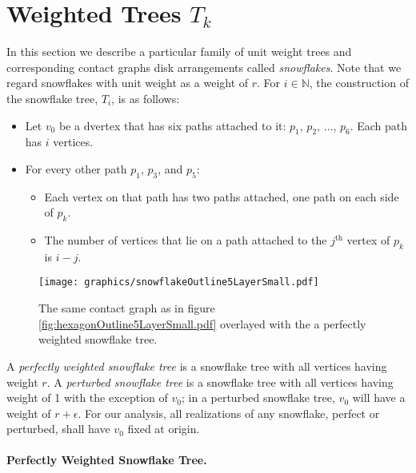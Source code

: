 \documentclass[10pt]{CSUNthesis}
\theoremstyle{plain}%
\theoremstyle{definition}
\theoremstyle{remark}
\newcommand{\bbN}{{\mathbb{N}}}
\begin{document}
\section{Weighted Trees $T_k$}
In this section we describe a particular family of unit weight trees and corresponding contact graphs disk arrangements called \textit{snowflakes}.  
Note that we regard snowflakes with unit weight as a weight of $r$.  
For $i \in \bbN$, the construction of the snowflake tree, $T_i$, is as follows:
\begin{itemize}
\item Let $v_0$ be a dvertex that has six paths attached to it: $p_1$, $p_2$, $\dots$, $p_6$.  Each path has $i$ vertices.
\item For every other path $p_1$, $p_3$, and $p_5$: 
	\begin{itemize}
		\item 	Each vertex on that path has two paths attached, one path on each side of $p_k$.
		\item	The number of vertices that lie on a path attached to the $j^\text{th}$ vertex of $p_k$ is $i-j$.
	\end{itemize}
\end{itemize}

\begin{figure}[!htbp]
\begin{center}
\texttt{[image: graphics/snowflakeOutline5LayerSmall.pdf]}
\caption{The same contact graph as in figure \ref{fig:hexagonOutline5LayerSmall.pdf} overlayed with the a perfectly weighted snowflake tree.}\label{fig:snowflakeOutline5LayerSmall.pdf}
\end{center}
\end{figure}

A \textit{perfectly weighted snowflake tree} is a snowflake tree with all vertices having weight $r$.   
A \textit{perturbed snowflake tree} is a snowflake tree with all vertices having weight of 1 with the exception of $v_0$;  in a perturbed snowflake tree, $v_0$ will have a weight of $r + \epsilon$.  
For our analysis, all realizations of any snowflake, perfect or perturbed, shall have $v_0$ fixed at origin.  

\paragraph{Perfectly Weighted Snowflake Tree.}
\end{document}
